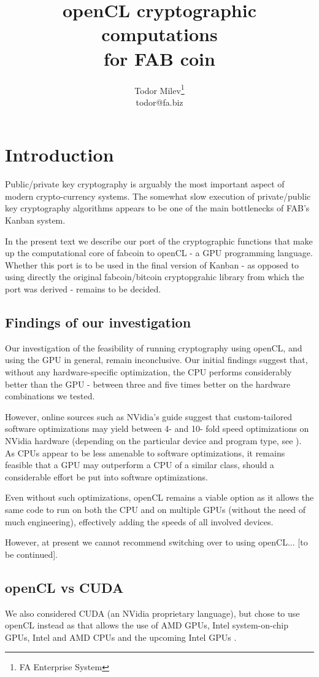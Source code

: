 \documentclass{article}
\title{
openCL cryptographic computations \\
for FAB coin
}
\author{Todor Milev\footnote{FA Enterprise System}\\ todor@fa.biz}
\begin{document}
\maketitle
\section{Introduction}
Public/private key cryptography is arguably the most important aspect of modern crypto-currency systems. The somewhat slow execution of private/public key cryptography algorithms appears to be one of the main bottlenecks of FAB's Kanban system. 

In the present text we describe our port of the cryptographic functions that make up the computational core of fabcoin to openCL - a GPU programming language. Whether this port is to be used in the final version of Kanban - as opposed to using directly the original fabcoin/bitcoin cryptopgrahic library from which the port was derived - remains to be decided.


\subsection{Findings of our investigation}
Our investigation of the feasibility of running cryptography using openCL, and using the GPU in general, remain inconclusive. Our initial findings suggest that, without any hardware-specific optimization, the CPU performs considerably better than the GPU - between three and five times better on the hardware combinations we tested. 

However, online sources such as NVidia's guide \cite{NVIDIA:openCLBestPractices} suggest that custom-tailored software optimizations may yield between 4- and 10- fold speed optimizations on NVidia hardware (depending on the particular device and program type, see \cite[page 22]{NVIDIA:openCLBestPractices}). As CPUs appear to be less amenable to software optimizations, it remains feasible that a GPU may outperform a CPU of a similar class, should a considerable effort be put into software optimizations. 

Even without such optimizations, openCL remains a viable option as it allows the same code to run on both the CPU and on multiple GPUs (without the need of much engineering), effectively adding the speeds of all involved devices. 

However, at present we cannot recommend switching over to using openCL... [to be continued].


\subsection{openCL vs CUDA}
We also considered CUDA (an NVidia proprietary language), but chose to use openCL instead as that allows the use of AMD GPUs, Intel system-on-chip GPUs, Intel and AMD CPUs and the upcoming Intel GPUs \cite{forbes:IntelGPUupcoming}. 
\end{document}
